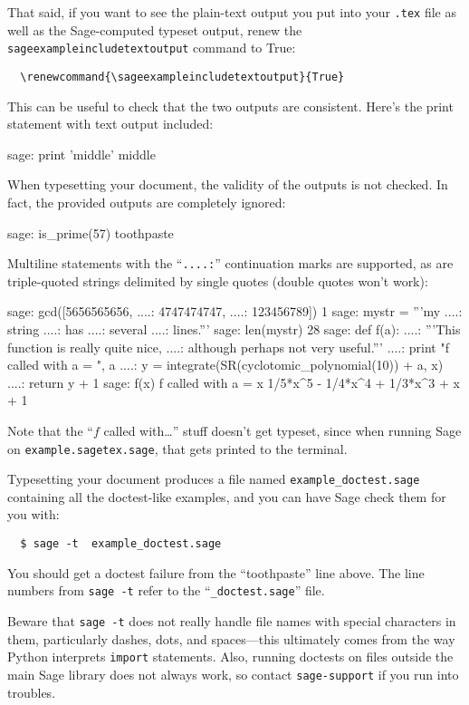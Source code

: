 \documentclass{article}
\begin{document}
That said, if you want to see the plain-text output you put into your
\verb|.tex| file as well as the Sage-computed typeset output, renew the
\texttt{sageexampleincludetextoutput} command to True:
\begin{verbatim}
  \renewcommand{\sageexampleincludetextoutput}{True}
\end{verbatim}
\renewcommand{\sageexampleincludetextoutput}{True}
This can be useful to check that the two outputs are consistent. Here's
the print statement with text output included:
\begin{sageexample}
  sage: print 'middle'
  middle
\end{sageexample}
When typesetting your document, the validity of the outputs is not
checked. In fact, the provided outputs are completely ignored:
\renewcommand{\sageexampleincludetextoutput}{True}
\begin{sageexample}
  sage: is_prime(57)
  toothpaste
\end{sageexample}
\renewcommand{\sageexampleincludetextoutput}{False}%
Multiline statements with the ``\verb|....:|'' continuation marks are
supported, as are triple-quoted strings delimited by single quotes
(double quotes won't work):
\begin{sageexample}
  sage: gcd([5656565656,
  ....:      4747474747,
  ....:      123456789])
  1
  sage: mystr = '''my
  ....: string
  ....: has
  ....: several
  ....: lines.'''
  sage: len(mystr)
  28
  sage: def f(a):
  ....:     '''This function is really quite nice,
  ....:     although perhaps not very useful.'''
  ....:     print "f called with a = ", a
  ....:     y = integrate(SR(cyclotomic_polynomial(10)) + a, x)
  ....:     return y + 1
  sage: f(x)
  f called with a =  x
  1/5*x^5 - 1/4*x^4 + 1/3*x^3 + x + 1
\end{sageexample}
Note that the ``$f$ called with\ldots'' stuff doesn't get typeset, since
when running Sage on \texttt{example.sagetex.sage}, that gets printed to the
terminal.

Typesetting your document produces a file named
\texttt{example\_doctest.sage} containing all the doctest-like examples,
and you can have Sage check them for you with:
\begin{verbatim}
  $ sage -t  example_doctest.sage
\end{verbatim}
You should get a doctest failure from the ``toothpaste'' line above. The
line numbers from \texttt{sage -t} refer to the ``\verb|_doctest.sage|''
file.

Beware that \texttt{sage -t} does not really handle file names with
special characters in them, particularly dashes, dots, and spaces---this
ultimately comes from the way Python interprets \texttt{import}
statements. Also, running doctests on files outside the main Sage
library does not always work, so contact \texttt{sage-support} if you
run into troubles.
\end{document}
